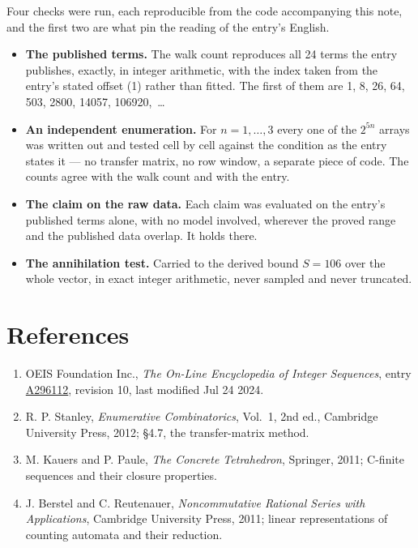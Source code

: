 \documentclass[11pt]{article}
\theoremstyle{definition}
\begin{document}
Four checks were run, each reproducible from the code accompanying this note, and the first two are what pin the reading of the entry's English.

\begin{itemize}

\item {\bfseries The published terms.} The walk count reproduces all 24 terms the entry publishes, exactly, in integer arithmetic, with the index taken from the entry's stated offset (1) rather than fitted. The first of them are 1, 8, 26, 64, 503, 2800, 14057, 106920,~\dots

\item {\bfseries An independent enumeration.} For $n = 1,\dots,3$ every one of the $2^{5n}$ arrays was written out and tested cell by cell against the condition as the entry states it --- no transfer matrix, no row window, a separate piece of code. The counts agree with the walk count and with the entry.

\item {\bfseries The claim on the raw data.} Each claim was evaluated on the entry's published terms alone, with no model involved, wherever the proved range and the published data overlap. It holds there.

\item {\bfseries The annihilation test.} Carried to the derived bound $S = 106$ over the whole vector, in exact integer arithmetic, never sampled and never truncated.

\end{itemize}

\section{References}

\begin{enumerate}

\item OEIS Foundation Inc., \emph{The On-Line Encyclopedia of Integer Sequences}, entry \href{https://oeis.org/A296112}{A296112}, revision 10, last modified Jul 24 2024.

\item R. P. Stanley, \emph{Enumerative Combinatorics}, Vol.~1, 2nd ed., Cambridge University Press, 2012; \S4.7, the transfer-matrix method.

\item M. Kauers and P. Paule, \emph{The Concrete Tetrahedron}, Springer, 2011; C-finite sequences and their closure properties.

\item J. Berstel and C. Reutenauer, \emph{Noncommutative Rational Series with Applications}, Cambridge University Press, 2011; linear representations of counting automata and their reduction.

\end{enumerate}
\end{document}
